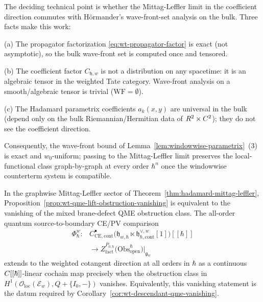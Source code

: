 \begin{rmk}\label{rmk:hormander-commutation}
  The deciding technical point is whether the Mittag-Leffler limit
  in the coefficient direction commutes with Hörmander's
  wave-front-set analysis on the bulk. Three facts make this work:

  (a) The propagator factorization
  \eqref{eq:wt-propagator-factor} is exact (not asymptotic), so
  the bulk wave-front set is computed once and tensored.

  (b) The coefficient factor $C_{\mathfrak h,w}$ is not a
  distribution on any spacetime: it is an algebraic tensor in the
  weighted Tate category. Wave-front analysis on a smooth/algebraic
  tensor is trivial ($\mathrm{WF}=\emptyset$).

  (c) The Hadamard parametrix coefficients $a_k(x,y)$ are universal
  in the bulk (depend only on the bulk Riemannian/Hermitian data of
  $R^2\times C^2$); they do not see the coefficient direction.

  Consequently, the wave-front bound of
  Lemma~\ref{lem:windowwise-parametrix}~(3) is exact and
  $w_0$-uniform; passing to the Mittag-Leffler limit preserves the
  local-functional class graph-by-graph at every order $\hbar^n$ once
  the windowwise counterterm system is compatible.
\end{rmk}

\begin{cor}\label{cor:wt-cotangent-lift-hadamard-criterion}
  In the graphwise Mittag-Leffler sector of
  Theorem~\ref{thm:hadamard-mittag-leffler},
  Proposition~\ref{prop:wt-qme-lift-obstruction-vanishing} is equivalent to the
  vanishing of the mixed brane-defect QME obstruction class.  The
  all-order quantum source-to-boundary CE/PV comparison
  \[
  \begin{aligned}
    \Phi_\hbar^{w}\colon
    &C^\bullet_{\mathrm{CE},\mathrm{cont}}\bigl(
      \mathfrak h_{w,\hbar}\ltimes
      \mathfrak h^{\vee,w}_{\hbar,\mathrm{cont}}[1]\bigr)[[\hbar]]\\
    &\longrightarrow
      Z^{P_{0,\hbar}}_{\mathrm{fact}}\bigl(
      \mathrm{Obs}^\hbar_{\mathrm{open}}\bigr)\big|_{\mathfrak g_w}
  \end{aligned}
  \]
  extends to the weighted cotangent direction at all orders in $\hbar$
  as a continuous $C[[\hbar]]$-linear cochain map precisely when the
  obstruction class in
  \(H^1(\mathcal O_{\mathrm{loc}}(\mathcal E_w),Q+\{I_0,-\})\)
  vanishes.  Equivalently, this vanishing statement is the datum required
  by Corollary~\ref{cor:wt-descendant-qme-vanishing}.
\end{cor}

